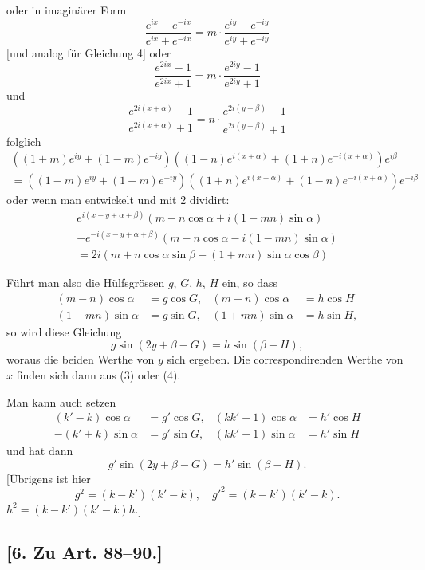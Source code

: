 \documentclass[12pt,a4paper]{article}
\begin{document}
\newpage

oder in imagin\"arer Form
\[
\frac{e^{ix} - e^{-ix}}{e^{ix} + e^{-ix}} = m \cdot \frac{e^{iy} - e^{-iy}}{e^{iy} + e^{-iy}}
\]
[und analog f\"ur Gleichung 4] oder
\[
\frac{e^{2ix} - 1}{e^{2ix} + 1} = m \cdot \frac{e^{2iy} - 1}{e^{2iy} + 1}
\]
und
\[
\frac{e^{2i(x+\alpha)} - 1}{e^{2i(x+\alpha)} + 1} = n \cdot \frac{e^{2i(y+\beta)} - 1}{e^{2i(y+\beta)} + 1}
\]
folglich
\begin{multline*}
((1 + m)e^{iy} + (1 - m)e^{-iy})((1 - n)e^{i(x+\alpha)} + (1 + n)e^{-i(x+\alpha)})e^{i\beta} \\
= ((1 - m)e^{iy} + (1 + m)e^{-iy})((1 + n)e^{i(x+\alpha)} + (1 - n)e^{-i(x+\alpha)})e^{-i\beta}
\end{multline*}
oder wenn man entwickelt und mit 2 dividirt:
\begin{multline*}
e^{i(x-y+\alpha+\beta)}(m - n\cos\alpha + i(1 - mn)\sin\alpha) \\
- e^{-i(x-y+\alpha+\beta)}(m - n\cos\alpha - i(1 - mn)\sin\alpha) \\
= 2i(m + n\cos\alpha \sin\beta - (1 + mn)\sin\alpha \cos\beta)
\end{multline*}

F\"uhrt man also die H\"ulfsgr\"ossen $g$, $G$, $h$, $H$ ein, so dass
\begin{align*}
(m - n)\cos\alpha &= g\cos G, & (m + n)\cos\alpha &= h\cos H \\
(1 - mn)\sin\alpha &= g\sin G, & (1 + mn)\sin\alpha &= h\sin H,
\end{align*}
so wird diese Gleichung
\begin{equation}\tag{5}
g\sin(2y + \beta - G) = h\sin(\beta - H),
\end{equation}
woraus die beiden Werthe von $y$ sich ergeben. Die correspondirenden Werthe
von $x$ finden sich dann aus (3) oder (4).

Man kann auch setzen
\begin{align*}
(k' - k)\cos\alpha &= g'\cos G, & (kk' - 1)\cos\alpha &= h'\cos H \\
-(k' + k)\sin\alpha &= g'\sin G, & (kk' + 1)\sin\alpha &= h'\sin H
\end{align*}
und hat dann
\[
g'\sin(2y + \beta - G) = h'\sin(\beta - H).
\]
[\"Ubrigens ist hier
\[
g^2 = (k - k')(k' - k), \quad g'^2 = (k - k')(k' - k).
\]
$h^2 = (k - k')(k' - k)h$.]

\subsection*{[6. Zu Art. 88--90.]}
\end{document}

